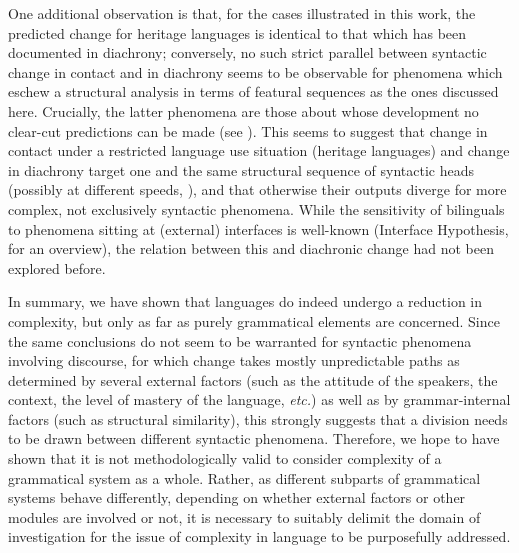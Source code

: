 \documentclass[output=paper]{langscibook}
\begin{document}
\begin{sloppypar}
One additional observation is that, for the cases illustrated in this work, the predicted change for heritage languages is identical to that which has been documented in diachrony; conversely, no such strict parallel between syntactic change in contact and in diachrony seems to be observable for phenomena which eschew a structural analysis in terms of featural sequences as the ones discussed here. Crucially, the latter phenomena are those about whose development no clear-cut predictions can be made (see %
\citet{DAlessandroEtAlIP}). This seems to suggest that change in contact under a restricted language use situation (heritage languages) and change in diachrony target one and the same structural sequence of syntactic heads (possibly at different speeds, \citealt{KupischPolinsky2022}), and that otherwise their outputs diverge for more complex, not exclusively syntactic phenomena. While the sensitivity of bilinguals to phenomena sitting at (external) interfaces is well-known (Interface Hypothesis, \citealt{SoraceSerratrice2009, Sorace2011} for an overview), the relation between this and diachronic change had not been explored before.
\end{sloppypar}

In summary, we have shown that languages do indeed undergo a reduction in complexity, but only as far as purely grammatical elements are concerned. Since the same conclusions do not seem to be warranted for syntactic phenomena involving discourse, for which change takes mostly unpredictable paths as determined by several external factors (such as the attitude of the speakers, the context, the level of mastery of the language, \textit{etc.}) as well as by grammar-internal factors (such as structural similarity), this strongly suggests that a division needs to be drawn between different syntactic phenomena. Therefore, we hope to have shown that it is not methodologically valid to consider complexity of a grammatical system as a whole. Rather, as different subparts of grammatical systems behave differently, depending on whether external factors or other modules are involved or not, it is necessary to suitably delimit the domain of investigation for the issue of complexity in language to be purposefully addressed.

\sloppy\printbibliography[heading=subbibliography,notkeyword=this]
\end{document}
